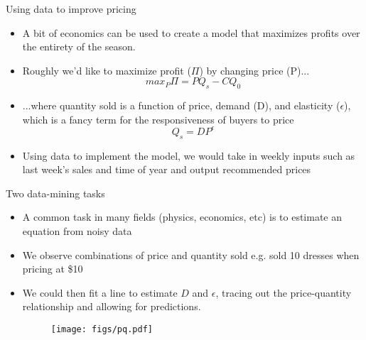 \documentclass{beamer}
\begin{document}
\begin{frame}{Using data to improve pricing}
\begin{itemize}
	\item A bit of economics can be used to create a model that maximizes profits over the entirety of the season.
	\item Roughly we'd like to maximize profit ($\Pi$) by changing price (P)...
	$$ max_P \Pi = PQ_s - CQ_0 $$
	\item ...where quantity sold is a function of price, demand (D), and elasticity ($\epsilon$), which is a fancy term for the responsiveness of buyers to price
	$$ Q_s = DP^{\epsilon} $$
  \item Using data to implement the model, we would take in weekly inputs such as last week's sales and time of year and output recommended prices
\end{itemize}
\end{frame}

\begin{frame}{Two data-mining tasks}
\begin{itemize}
  \item A common task in many fields (physics, economics, etc) is to estimate an equation from noisy data
  \item We observe combinations of price and quantity sold e.g. sold 10 dresses when pricing at \$10
  \item We could then fit a line to estimate $D$ and $\epsilon$, tracing out the price-quantity relationship and allowing for predictions.
  \begin{figure}
    \texttt{[image: figs/pq.pdf]}
  \end{figure}  
\end{itemize}
\end{frame}
\end{document}

